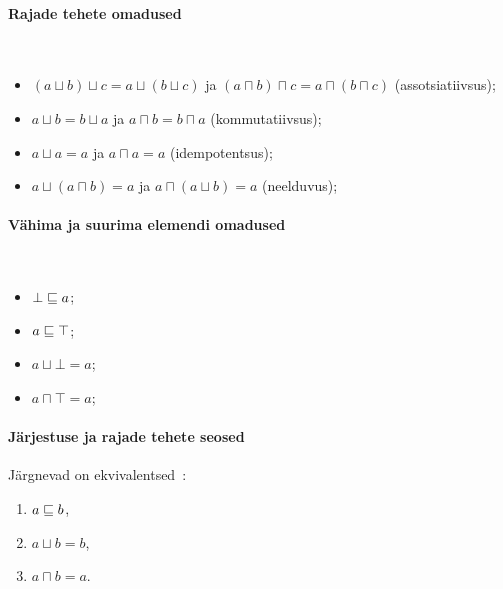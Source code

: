 \documentclass[../thesis.tex]{subfiles}
\begin{document}
\paragraph{Rajade tehete omadused}~\cites[6]{laan_voreteooria}[39]{davey_lattices}
\begin{itemize}[nosep]
	\item $(a \sqcup b) \sqcup c = a \sqcup (b \sqcup c)$ ja $(a \sqcap b) \sqcap c = a \sqcap (b \sqcap c)$ (assotsiatiivsus);
	\item $a \sqcup b = b \sqcup a$ ja $a \sqcap b = b \sqcap a$ (kommutatiivsus);
	\item $a \sqcup a = a$ ja $a \sqcap a = a$ (idempotentsus);
	\item $a \sqcup (a \sqcap b) = a$ ja $a \sqcap (a \sqcup b) = a$ (neelduvus);
\end{itemize}

\paragraph{Vähima ja suurima elemendi omadused}~\cite{might_orders}
\begin{itemize}[nosep]
	\item $\bot \sqsubseteq a$;
	\item $a \sqsubseteq \top$;
	\item $a \sqcup \bot = a$;
	\item $a \sqcap \top = a$;
\end{itemize}

\paragraph{Järjestuse ja rajade tehete seosed}
Järgnevad on ekvivalentsed~\cite[39]{davey_lattices}:
\begin{enumerate}[nosep]
	\item $a \sqsubseteq b$,
	\item $a \sqcup b = b$,
	\item $a \sqcap b = a$.
\end{enumerate}
\end{document}
